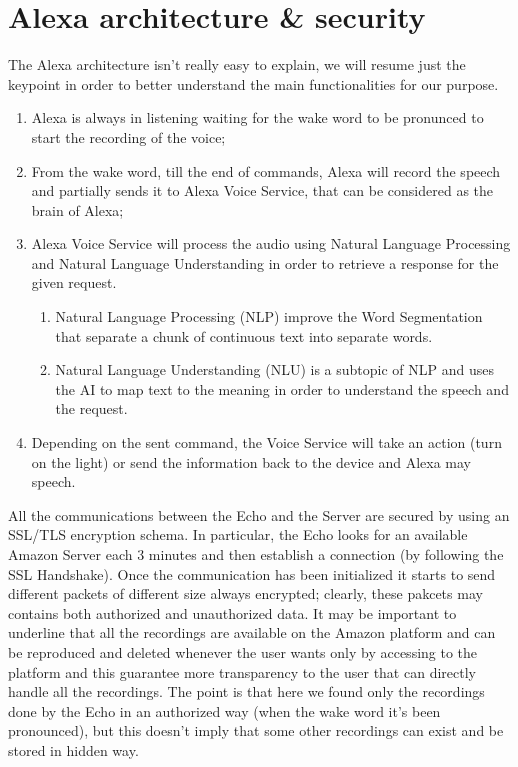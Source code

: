 \documentclass[sigconf]{acmart}
\begin{document}
    \section{Alexa architecture \& security}
    The Alexa architecture isn't really easy to explain, we will resume just the keypoint in order to better understand the main functionalities for our purpose.
    \begin{enumerate}
        \item Alexa is always in listening waiting for the wake word to be pronunced to start the recording of the voice;
        \item From the wake word, till the end of commands, Alexa will record the speech and partially sends it to Alexa Voice Service, that can be considered as the brain of Alexa;
        \item Alexa Voice Service will process the audio using Natural Language Processing and Natural Language Understanding in order to retrieve a response for the given request.
        \begin{enumerate}
            \item Natural Language Processing (NLP) improve the Word Segmentation that separate a chunk of continuous text into separate words.
            \item Natural Language Understanding (NLU) is a subtopic of NLP and uses the AI to map text to the meaning\cite{NLU} in order to understand the speech and the request.
        \end{enumerate}
        \item Depending on the sent command, the Voice Service will take an action (turn on the light) or send the information back to the device and Alexa may speech.
    \end{enumerate}
    All the communications between the Echo and the Server are secured by using an SSL/TLS encryption schema.
    In particular, the Echo looks for an available Amazon Server each 3 minutes and then establish a connection (by following the SSL Handshake).
    Once the communication has been initialized it starts to send different packets of different size always encrypted; clearly, these pakcets may contains both authorized and unauthorized data.
    It may be important to underline that all the recordings are available on the Amazon platform and can be reproduced and deleted whenever the user wants only by accessing to the platform and this guarantee more transparency to the user that can directly handle all the recordings.
    The point is that here we found only the recordings done by the Echo in an authorized way (when the wake word it's been pronounced), but this doesn't imply that some other recordings can exist and be stored in hidden way.
\end{document}
